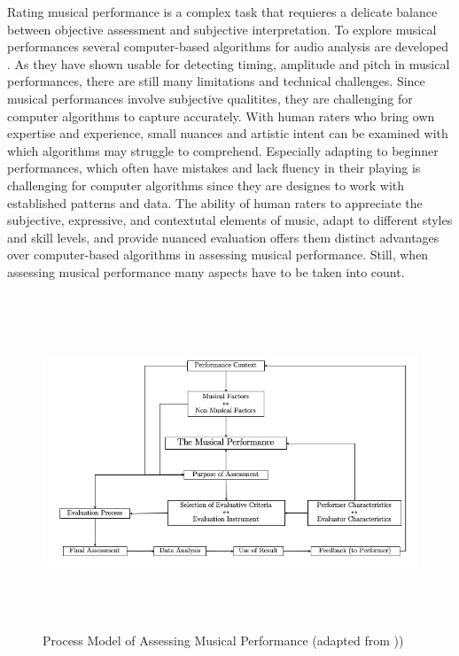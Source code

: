 Rating musical performance is a complex task that requieres a delicate balance between objective assessment and subjective interpretation. To explore musical performances several computer-based algorithms for audio analysis are developed \cite{Goebl2014}. As they have shown usable for detecting timing, amplitude and pitch in musical performances, there are still many limitations and technical challenges. Since musical performances involve subjective qualitites, they are challenging for computer algorithms to capture accurately. With human raters who bring own expertise and experience, small nuances and artistic intent can be examined with which algorithms may struggle to comprehend. Especially adapting to beginner performances, which often have mistakes and lack fluency in their playing is challenging for computer algorithms since they are designes to work with established patterns and data. The ability of human raters to appreciate the subjective, expressive, and contextutal elements of music, adapt to different styles and skill levels, and provide nuanced evaluation offers them distinct advantages over computer-based algorithms in assessing musical performance. Still, when assessing musical performance many aspects have to be taken into count. 

\begin{figure}[]
	\centering
	\includegraphics[width=15cm,height=10cm,keepaspectratio]{Assessing}
	\caption{Process Model of Assessing Musical Performance (adapted from \cite{McPhearson1998}))}
	\label{fig:assess}
\end{figure}

